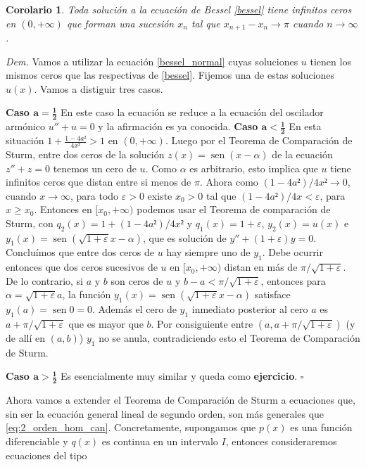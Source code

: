\documentclass{article}
\newenvironment{demo}{\noindent\emph{Dem.}}{{\hspace*{\fill}$\square$} \newline\vspace{5pt}}
\renewcommand{\epsilon}{\varepsilon}
\DeclareMathOperator{\sen}{sen}
\newtheorem{corolario}[teorema]{Corolario}
\begin{document}
\begin{corolario}  Toda solución a la ecuación de Bessel \eqref{bessel} tiene infinitos ceros en $(0,+\infty)$ que forman una sucesión $x_n$ tal que $x_{n+1}-x_n\to\pi$ cuando $n\to\infty$.
\end{corolario}
\begin{demo} Vamos a utilizar la ecuación \eqref{bessel_normal} cuyas soluciones $u$ tienen los mismos ceros que las respectivas de \eqref{bessel}. Fijemos una de estas soluciones $u(x)$. Vamos a distiguir tres casos.

\noindent\textbf{Caso $\boldsymbol{a=\frac12}$} En este caso la ecuación se reduce a la ecuación del oscilador armónico $u''+u=0$ y la afirmación es ya conocida.
\noindent\textbf{Caso $\boldsymbol{a<\frac12}$} En esta situación $1+\frac{1-4a²}{4x²}>1$ en $(0,+\infty)$.  Luego por el Teorema de Comparación de Sturm, entre dos ceros de la solución $z(x)=\sen(x-\alpha)$ de la ecuación $z''+z=0$ tenemos un cero de $u$. Como $\alpha$ es arbitrario, esto implica que $u$ tiene infinitos ceros que distan entre si menos de $\pi$. Ahora como $(1-4a²)/4x²\to 0$, cuando $x\to\infty$, para todo $\epsilon>0$ existe $x_0>0$ tal que   $(1-4a²)/4x<\epsilon$, para $x\geq x_0$. Entonces en $[x_0,+\infty)$  podemos usar el Teorema de comparación de Sturm, con $q_2(x)=1+(1-4a²)/4x²$ y $q_1(x)=1+\epsilon$, $y_2(x)=u(x)$ e $y_1(x)=\sen(\sqrt{1+\epsilon}x-\alpha)$, que es solución de $y''+(1+\epsilon)y=0$. Concluímos que entre dos ceros de $u$ hay siempre uno de $y_1$. Debe ocurrir entonces que  dos ceros sucesivos de $u$ en $[x_0,+\infty)$ distan en más de $\pi/\sqrt{1+\epsilon}$. De lo contrario, si $a$ y $b$ son ceros de $u$ y $b-a< \pi/\sqrt{1+\epsilon}$, entonces para $\alpha=\sqrt{1+\epsilon}a$,   la función $y_1(x)=\sen(\sqrt{1+\epsilon}x-\alpha)$ satisface $y_1(a)=\sen0=0$. Además el cero de $y_1$ inmediato posterior al cero $a$ es  $a+\pi/\sqrt{1+\epsilon}$ que es mayor que $b$. Por consiguiente entre $(a,a+\pi/\sqrt{1+\epsilon})$ (y de allí en $(a,b)$) $y_1$ no se anula, contradiciendo esto el Teorema de Comparación de Sturm.

\noindent\textbf{Caso $\boldsymbol{a>\frac12}$} Es esencialmente muy similar y queda como \textbf{ejercicio}.
\end{demo}

Ahora vamos a extender el Teorema de Comparación de Sturm a ecuaciones que, sin ser la ecuación general lineal de segundo orden, son más generales que \eqref{eq:2_orden_hom_can}. Concretamente, supongamos que $p(x)$ es una función diferenciable y $q(x)$ es continua en un intervalo $I$, entonces consideraremos ecuaciones del tipo
\end{document}
